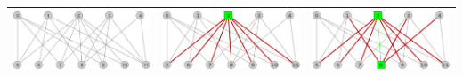\begin{center}
\begin{tabular}{ |c||c||c| }
			\hline
			\includegraphics[scale = 0.2]{img/ej3/constructiva_golosa/bipartito1_st0.png} &
			\includegraphics[scale = 0.2]{img/ej3/constructiva_golosa/bipartito1_st01.png} &
			\includegraphics[scale = 0.2]{img/ej3/constructiva_golosa/bipartito1_st02.png} \\
			\hline
		\end{tabular}
	\end{center}
